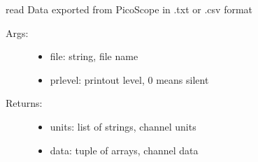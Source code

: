 \documentclass[letterpaper,10pt,english]{sphinxmanual}
\begin{document}
\begin{fulllineitems}
\label{\detokenize{index:PhyPraKit.PhyPraKit.readPicoScope}}
read Data exported from PicoScope in .txt or .csv format
\begin{description}
\item[{Args:}] \leavevmode\begin{itemize}
\item {} 
file: string, file name

\item {} 
prlevel: printout level, 0 means silent

\end{itemize}

\item[{Returns:}] \leavevmode\begin{itemize}
\item {} 
units: list of strings, channel units

\item {} 
data: tuple of arrays, channel data

\end{itemize}

\end{description}

\end{fulllineitems}

\end{document}
